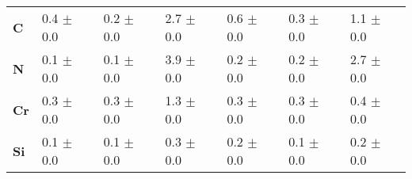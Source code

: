 {\begin{tabular}{@{}lllllll@{}}
			\textbf{C} & 0.4 $\pm${} 0.0 & 0.2 $\pm${} 0.0 & 2.7 $\pm${} 0.0 & 0.6 $\pm${} 0.0 & 0.3 $\pm${} 0.0 & 1.1 $\pm${} 0.0 \\
			\textbf{N} & 0.1 $\pm${} 0.0 & 0.1 $\pm${} 0.0 & 3.9 $\pm${} 0.0 & 0.2 $\pm${} 0.0 & 0.2 $\pm${} 0.0 & 2.7 $\pm${} 0.0 \\
			\textbf{Cr} & 0.3 $\pm${} 0.0 & 0.3 $\pm${} 0.0 & 1.3 $\pm${} 0.0 & 0.3 $\pm${} 0.0 & 0.3 $\pm${} 0.0 & 0.4 $\pm${} 0.0 \\
			\textbf{Si} & 0.1 $\pm${} 0.0 & 0.1 $\pm${} 0.0 & 0.3 $\pm${} 0.0 & 0.2 $\pm${} 0.0 & 0.1 $\pm${} 0.0 & 0.2 $\pm${} 0.0
		\end{tabular}%
	}


